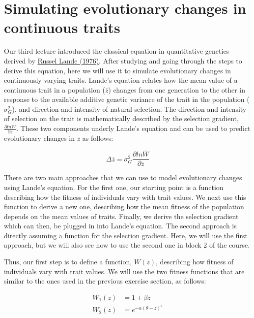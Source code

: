 \documentclass[
]{book}
\begin{document}
\hypertarget{simulating-evolutionary-changes-in-continuous-traits}{%
\section{Simulating evolutionary changes in continuous traits}\label{simulating-evolutionary-changes-in-continuous-traits}}

Our third lecture introduced the classical equation in quantitative genetics derived by \href{https://onlinelibrary.wiley.com/doi/10.1111/j.1558-5646.1976.tb00911.x}{Russel Lande (1976)}. After studying and going through the steps to derive this equation, here we will use it to simulate evolutionary changes in continuously varying traits. Lande's equation relates how the mean value of a continuous trait in a population (\(\overline{z}\)) changes from one generation to the other in response to the available additive genetic variance of the trait in the population (\(\sigma^{2}_{G}\)), and direction and intensity of natural selection. The direction and intensity of selection on the trait is mathematically described by the selection gradient, \(\frac{\partial ln\overline{W}}{\partial \overline{z}}\). These two components underly Lande's equation and can be used to predict evolutionary changes in \(\overline{z}\) as follows:

\[
\Delta \overline{z}=\sigma^{2}_{G}\frac{\partial ln\overline{W}}{\partial \overline{z}}
\]

There are two main approaches that we can use to model evolutionary changes using Lande's equation. For the first one, our starting point is a function describing how the fitness of individuals vary with trait values. We next use this function to derive a new one, describing how the mean fitness of the population depends on the mean values of traits. Finally, we derive the selection gradient which can then, be plugged in into Lande's equation. The second approach is directly assuming a function for the selection gradient. Here, we will use the first approach, but we will also see how to use the second one in block 2 of the course.

Thus, our first step is to define a function, \(W(z)\), describing how fitness of individuals vary with trait values. We will use the two fitness functions that are similar to the ones used in the previous exercise section, as follows:

\[\begin{align}
W_{1}(z) &= 1+\beta z \\
W_{2}(z) &= e^{-\alpha\left(\theta-z\right)^2}
\end{align}\]
\end{document}
